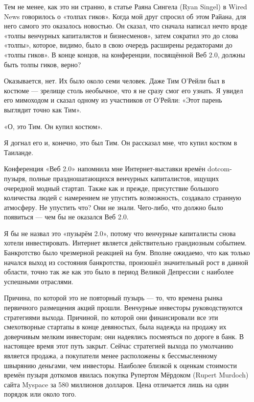 \documentclass[ebook,12pt,oneside,openany]{memoir}
\begin{document}
Тем не менее, как это ни странно, в статье Раяна Сингела (Ryan Singel)
в Wired News говорилось о «толпах гиков». Когда мой друг спросил об
этом Райана, для него самого это оказалось новостью. Он сказал, что
сначала написал нечто вроде «толпы венчурных капиталистов и
бизнесменов», затем сократил это до слова «толпы», которое, видимо,
было в свою очередь расширены редакторами до «толпы гиков». В конце
концов, на конференции, посвящённой Веб 2.0, должны быть толпы гиков,
верно?

Оказывается, нет. Их было около семи человек. Даже Тим О'Рейли был в
костюме — зрелище столь необычное, что я не сразу смог его узнать. Я
увидел его мимоходом и сказал одному из участников от О'Рейли: «Этот
парень выглядит точно как Тим».

«О, это Тим. Он купил костюм».

Я догнал его и, конечно, это был Тим. Он рассказал мне, что купил
костюм в Таиланде.

Конференция «Веб 2.0» напомнила мне Интернет-выставки времён
dotcom-пузыря, полные праздношатающихся венчурных капиталистов, ищущих
очередной модный стартап. Также как и прежде, присутствие большого
количества людей с намерением не упустить возможность, создавало
странную атмосферу. Не упустить что? Они не знали. Чего-либо, что
должно было появиться — чем бы не оказался Веб 2.0.

Я бы не назвал это «пузырём 2.0», потому что венчурные капиталисты
снова хотели инвестировать. Интернет является действительно
грандиозным событием. Банкротство было чрезмерной реакцией на бум.
Вполне ожидаемо, что как только начался выход из состояния
банкротства, произошёл значительный рост в данной области, точно так
же как это было в период Великой Депрессии с наиболее успешными
отраслями.

Причина, по которой это не повторный пузырь — то, что времена рынка
первичного размещения акций прошли. Венчурные инвесторы
руководствуются стратегиями выхода. Причиной, по которой они
финансировали все эти смехотворные стартапы в конце девяностых, была
надежда на продажу их доверчивым мелким инвесторам; они надеялись
посмеяться по дороге в банк. В настоящее время этот путь закрыт.
Сейчас стратегией выхода по умолчанию является продажа, а покупатели
менее расположены к бессмысленному швырянию деньгами, чем инвесторы.
Наиболее близкой к оценкам стоимости времён пузыря доткомов явилась
покупка Рупертом Мёрдоком (Rupert Murdoch) сайта Myspace за 580
миллионов долларов. Цена отличается лишь на один порядок или около
того.
\end{document}

